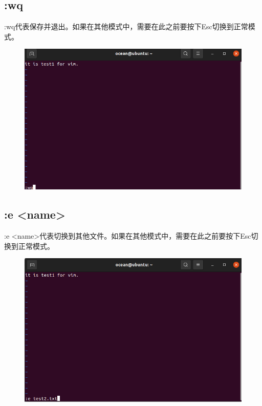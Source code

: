 \documentclass{article}
\begin{document}
\subsection{:wq}
:wq代表保存并退出。如果在其他模式中，需要在此之前要按下Esc切换到正常模式。
\begin{figure}[H]
    \centering
    \includegraphics[width=1\linewidth]{wq.png}
\end{figure}

\subsection{:e <name>}
:e <name>代表切换到其他文件。如果在其他模式中，需要在此之前要按下Esc切换到正常模式。
\begin{figure}[H]
    \centering
    \includegraphics[width=1\linewidth]{e1.png}
\end{figure}
\end{document}
